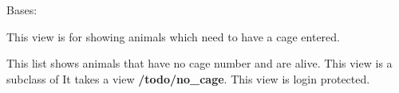 \documentclass[letterpaper,10pt,english]{sphinxmanual}
\begin{document}
\begin{fulllineitems}
\label{api:mousedb.animal.views.NoCageList}
Bases: {\hyperref[api:mousedb.animal.views.AnimalList]{}}

This view is for showing animals which need to have a cage entered.

This list shows animals that have no cage number and are alive.
This view is a subclass of {\hyperref[api:mousedb.animal.views.AnimalList]{}}
It takes a view \textbf{/todo/no\_cage}.
This view is login protected.

\begin{fulllineitems}
\label{api:mousedb.animal.views.NoCageList.queryset}
\end{fulllineitems}


\end{fulllineitems}

\end{document}
